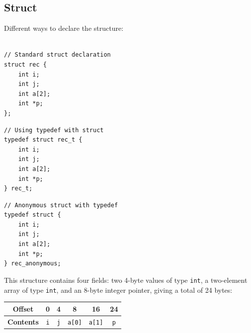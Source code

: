 \documentclass{article}
\begin{document}
\subsection{Struct}
Different ways to declare the structure: \\
\\
\noindent
\begin{minipage}{0.45\textwidth}
\begin{verbatim}
// Standard struct declaration
struct rec {
    int i;
    int j;
    int a[2];
    int *p;
};
\end{verbatim}
\end{minipage}
\hfill
\begin{minipage}{0.45\textwidth}
\begin{verbatim}
// Using typedef with struct
typedef struct rec_t {
    int i;
    int j;
    int a[2];
    int *p;
} rec_t;
\end{verbatim}
\end{minipage}

\vspace{1em}

\noindent
\begin{minipage}{0.45\textwidth}
\begin{verbatim}
// Anonymous struct with typedef
typedef struct {
    int i;
    int j;
    int a[2];
    int *p;
} rec_anonymous;
\end{verbatim}
\end{minipage}

\vspace{1em}

This structure contains four fields: two 4-byte values of type \texttt{int}, a two-element array of type \texttt{int}, and an 8-byte integer pointer, giving a total of 24 bytes:

\begin{table}[h]
    \centering
    \renewcommand{\arraystretch}{1.5}
    \begin{tabular}{c c c c c c}
        \toprule
        \textbf{Offset} & 0 & 4 & 8 & 16 & 24 \\
        \midrule
        \textbf{Contents} & \texttt{i} & \texttt{j} & \texttt{a[0]} & \texttt{a[1]} & \texttt{p} \\
        \bottomrule
    \end{tabular}
\end{table}
\end{document}
